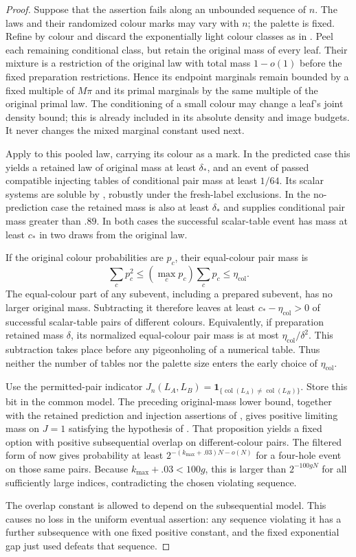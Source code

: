\begin{proof}
Suppose that the assertion fails along an unbounded sequence of $n$.
The laws and their randomized colour marks may vary with $n$; the
palette is fixed. Refine by colour and discard the exponentially light
colour classes as in . Peel each remaining conditional
class, but retain the original mass of every leaf. Their mixture is a
restriction of the original law with total mass $1-o(1)$ before the
fixed preparation restrictions. Hence its endpoint marginals remain
bounded by a fixed multiple of $M\pi$ and its primal marginals by the
same multiple of the original primal law. The conditioning of a small
colour may change a leaf's joint density bound; this is already included
in its absolute density and image budgets. It never changes the mixed
marginal constant used next.

Apply  to this pooled law, carrying its
colour as a mark. In the predicted case this yields a retained law of
original mass at least $\delta_*$, and an event of passed compatible
injecting tables of conditional pair mass at least $1/64$. Its scalar
systems are soluble by , robustly under the
fresh-label exclusions. In the no-prediction case the retained mass is
also at least $\delta_*$ and  supplies conditional
pair mass greater than $.89$. In both cases the successful scalar-table
event has mass at least $c_*$ in two draws from the original law.

If the original colour probabilities are $p_c$, their equal-colour
pair mass is
\[
 \sum_c p_c^2\le (\max_c p_c)\sum_c p_c
 \le\eta_{\mathrm{col}}.
\]
The equal-colour part of any subevent, including a prepared subevent,
has no larger original mass. Subtracting it therefore leaves at least
$c_*-\eta_{\mathrm{col}}>0$ of successful scalar-table pairs of different
colours. Equivalently, if preparation retained mass $\delta$, its
normalized equal-colour pair mass is at most
$\eta_{\mathrm{col}}/\delta^2$. This subtraction takes place before any
pigeonholing of a numerical table. Thus neither the number of tables nor
the palette size enters the early choice of $\eta_{\mathrm{col}}$.

Use the permitted-pair indicator
$J_n(L_A,L_B)=\mathbf1_{\{\operatorname{col}(L_A)
\ne\operatorname{col}(L_B)\}}$. Store this bit in the common model.
The preceding original-mass lower bound, together with the retained
prediction and injection assertions of , gives
positive limiting mass on $J=1$ satisfying the hypothesis of
. That proposition yields a fixed option
with positive subsequential overlap on different-colour pairs.
The filtered form of  now gives probability at
least $2^{-(k_{\max}+.03)N-o(N)}$ for a four-hole event on those same
pairs. Because $k_{\max}+.03<100g$, this is larger than
$2^{-100gN}$ for all sufficiently large indices, contradicting the
chosen violating sequence.

The overlap constant is allowed to depend on the subsequential model.
This causes no loss in the uniform eventual assertion: any sequence
violating it has a further subsequence with one fixed positive constant,
and the fixed exponential gap just used defeats that sequence.
\end{proof}
